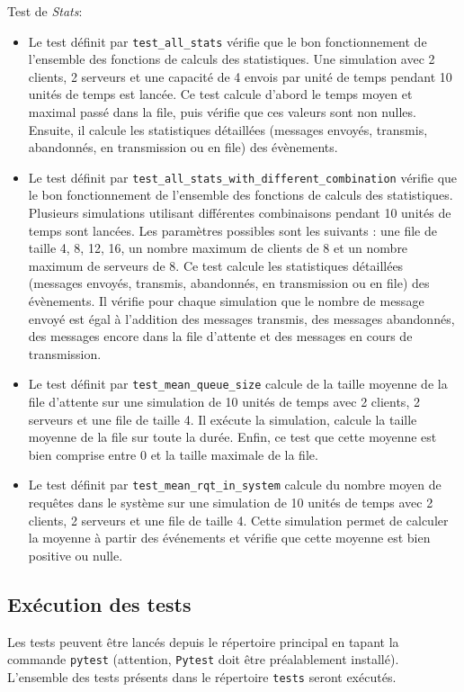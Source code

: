 \documentclass[11pt,a4paper]{article}
\begin{document}
Test de \emph{Stats}:
\begin{itemize}
    \item Le test définit par \lstinline|test_all_stats| vérifie que le bon fonctionnement de l'ensemble des fonctions de calculs des statistiques. Une simulation avec 2 clients, 2 serveurs et une capacité de 4 envois par unité de temps pendant 10 unités de temps est lancée. Ce test calcule d'abord le temps moyen et maximal passé dans la file, puis vérifie que ces valeurs sont non nulles. Ensuite, il calcule les statistiques détaillées (messages envoyés, transmis, abandonnés, en transmission ou en file) des évènements. 
    \item Le test définit par \lstinline|test_all_stats_with_different_combination| vérifie que le bon fonctionnement de l'ensemble des fonctions de calculs des statistiques. Plusieurs simulations utilisant différentes combinaisons pendant 10 unités de temps sont lancées. Les paramètres possibles sont les suivants : une file de taille 4, 8, 12, 16, un nombre maximum de clients de 8 et un nombre maximum de serveurs de 8. Ce test calcule les statistiques détaillées (messages envoyés, transmis, abandonnés, en transmission ou en file) des évènements. Il vérifie pour chaque simulation que le nombre de message envoyé est égal à l'addition des messages transmis, des messages abandonnés, des messages encore dans la file d'attente et des messages en cours de transmission.
    \item Le test définit par \lstinline|test_mean_queue_size| calcule de la taille moyenne de la file d'attente sur une simulation de 10 unités de temps avec 2 clients, 2 serveurs et une file de taille 4. Il exécute la simulation, calcule la taille moyenne de la file sur toute la durée. Enfin, ce test que cette moyenne est bien comprise entre 0 et la taille maximale de la file.
    \item Le test définit par \lstinline|test_mean_rqt_in_system| calcule du nombre moyen de requêtes dans le système sur une simulation de 10 unités de temps avec 2 clients, 2 serveurs et une file de taille 4. Cette simulation permet de calculer la moyenne à partir des événements et vérifie que cette moyenne est bien positive ou nulle.
\end{itemize}
 
\bigskip

\subsection{Exécution des tests}
Les tests peuvent être lancés depuis le répertoire principal en tapant la commande \lstinline|pytest| (attention, \lstinline|Pytest| doit être préalablement installé).
L'ensemble des tests présents dans le répertoire \lstinline|tests| seront exécutés.
\end{document}
